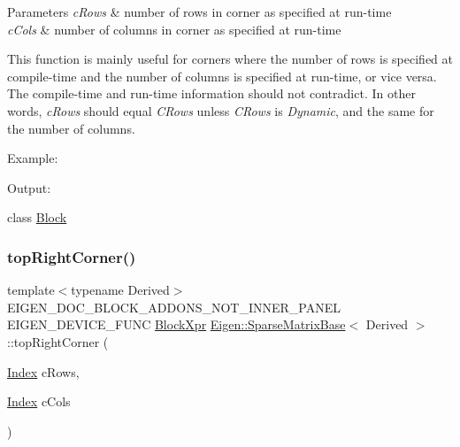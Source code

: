 \begin{DoxyParams}{Parameters}
{\em c\+Rows} & number of rows in corner as specified at run-\/time \\
\hline
{\em c\+Cols} & number of columns in corner as specified at run-\/time\\
\hline
\end{DoxyParams}
This function is mainly useful for corners where the number of rows is specified at compile-\/time and the number of columns is specified at run-\/time, or vice versa. The compile-\/time and run-\/time information should not contradict. In other words, {\itshape c\+Rows} should equal {\itshape C\+Rows} unless {\itshape C\+Rows} is {\itshape Dynamic}, and the same for the number of columns.

Example\+: 
\begin{DoxyCodeInclude}{0}
\end{DoxyCodeInclude}
 Output\+: 
\begin{DoxyVerbInclude}
\end{DoxyVerbInclude}
 class \mbox{\hyperlink{class_eigen_1_1_block}{Block}} \mbox{\label{class_eigen_1_1_sparse_matrix_base_a709232ffb83f5c4c054de1c7655e8b99}} 
\subsubsection{\texorpdfstring{topRightCorner()}{topRightCorner()}\hspace{0.1cm}{\footnotesize\ttfamily [1/3]}}
{\footnotesize\ttfamily template$<$typename Derived$>$ \\
E\+I\+G\+E\+N\+\_\+\+D\+O\+C\+\_\+\+B\+L\+O\+C\+K\+\_\+\+A\+D\+D\+O\+N\+S\+\_\+\+N\+O\+T\+\_\+\+I\+N\+N\+E\+R\+\_\+\+P\+A\+N\+EL E\+I\+G\+E\+N\+\_\+\+D\+E\+V\+I\+C\+E\+\_\+\+F\+U\+NC \mbox{\hyperlink{class_eigen_1_1_block}{Block\+Xpr}} \mbox{\hyperlink{class_eigen_1_1_sparse_matrix_base}{Eigen\+::\+Sparse\+Matrix\+Base}}$<$ Derived $>$\+::top\+Right\+Corner (\begin{DoxyParamCaption}\item[{\mbox{\hyperlink{struct_eigen_1_1_eigen_base_a554f30542cc2316add4b1ea0a492ff02}{Index}}}]{c\+Rows,  }\item[{\mbox{\hyperlink{struct_eigen_1_1_eigen_base_a554f30542cc2316add4b1ea0a492ff02}{Index}}}]{c\+Cols }\end{DoxyParamCaption})\hspace{0.3cm}{\ttfamily [inline]}}

